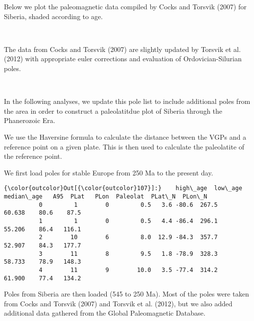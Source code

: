 \documentclass[11pt]{article}
\begin{document}
    Below we plot the paleomagnetic data compiled by Cocks and Torsvik
(2007) for Siberia, shaded according to age.


    \begin{center}
    \end{center}
    { \hspace*{\fill} \\}
    
    The data from Cocks and Torsvik (2007) are slightly updated by Torsvik
et al. (2012) with appropriate euler corrections and evaluation of
Ordovician-Silurian poles.


    \begin{center}
    \end{center}
    { \hspace*{\fill} \\}
    
    In the following analyses, we update this pole list to include
additional poles from the area in order to construct a paleolatitdue
plot of Siberia through the Phanerozoic Era.

    We use the Haversine formula to calculate the distance between the VGPs
and a reference point on a given plate. This is then used to calculate
the paleolatite of the reference point.


    We first load poles for stable Europe from 250 Ma to the present day.


            \begin{Verbatim}[commandchars=\\\{\}]
{\color{outcolor}Out[{\color{outcolor}107}]:}    high\_age  low\_age  median\_age   A95  PLat   PLon  Paleolat  PLat\_N  PLon\_N
          0         1        0         0.5   3.6 -80.6  267.5    60.638    80.6    87.5
          1         1        0         0.5   4.4 -86.4  296.1    55.206    86.4   116.1
          2        10        6         8.0  12.9 -84.3  357.7    52.907    84.3   177.7
          3        11        8         9.5   1.8 -78.9  328.3    58.733    78.9   148.3
          4        11        9        10.0   3.5 -77.4  314.2    61.900    77.4   134.2
\end{Verbatim}
        
    Poles from Siberia are then loaded (545 to 250 Ma). Most of the poles
were taken from Cocks and Torsvik (2007) and Torsvik et al. (2012), but
we also added additional data gathered from the Global Paleomagnetic
Database.
\end{document}
